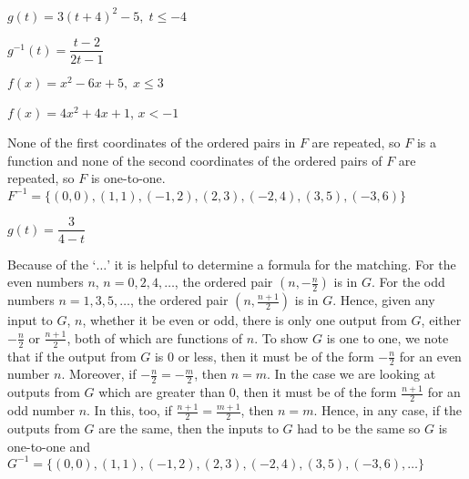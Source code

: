 \documentclass{ximera}
\begin{document}
\begin{question}
$g(t) = 3(t + 4)^{2} - 5, \; t \leq -4$

\begin{solution}
$g^{-1}(t) = \dfrac{t-2}{2t-1}$ 

\end{solution}

\end{question}

\begin{question}
$f(x) = x^2-6x+5, \; x \leq 3$
\begin{solution}
\end{solution}

\end{question}

\begin{question}
$f(x) = 4x^2 + 4x + 1$, $x < -1$

\begin{solution}
None of the first coordinates of the ordered pairs in $F$ are repeated, so $F$ is a function and none of the second coordinates of the ordered pairs of $F$ are repeated, so $F$ is one-to-one.   $F^{-1} = \{ (0,0), (1,1), (-1,2), (2,3), (-2,4), (3,5), (-3,6)  \}$
\end{solution}

\end{question}

\begin{question}
$g(t) = \dfrac{3}{4-t}$
\begin{solution}
Because of the `$\ldots$' it is helpful to determine a formula for the matching. For the even numbers $n$, $n = 0, 2, 4, \ldots$, the ordered pair $\left(n, -\frac{n}{2} \right)$ is in $G$.  For the odd numbers  $n = 1, 3, 5, \ldots$, the ordered pair $\left(n, \frac{n+1}{2} \right)$ is in $G$.  Hence, given any input to $G$, $n$, whether it be even or odd, there is only one output from $G$, either $-\frac{n}{2}$ or $\frac{n+1}{2}$, both of which are functions of $n$. To show $G$ is one to one, we note that if the output from $G$ is $0$ or less, then it must be of the form $-\frac{n}{2}$ for an even number $n$.  Moreover, if $-\frac{n}{2} = -\frac{m}{2}$, then $n = m$. In the case we are looking at outputs from $G$ which are greater than $0$, then it must be of the form $\frac{n+1}{2}$ for an odd number $n$.  In this, too, if  $\frac{n+1}{2} = \frac{m+1}{2}$, then $n = m$.  Hence, in any case, if the outputs from $G$ are the same, then the inputs to $G$ had to be the same so  $G$ is one-to-one and $G^{-1} = \{ (0,0), (1,1), (-1,2), (2,3), (-2,4), (3,5), (-3,6), \ldots \}$
\end{solution}

\end{question}
\end{document}
